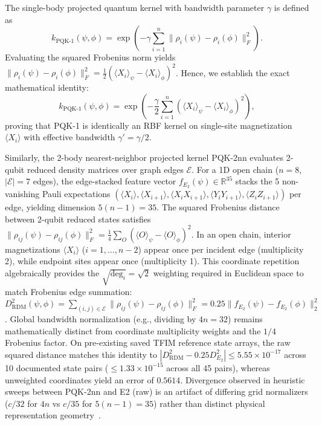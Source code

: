 \documentclass[conference]{IEEEtran}
\begin{document}
The single-body projected quantum kernel with bandwidth parameter $\gamma$ is defined as
\begin{equation}
k_{\text{PQK-1}}(\psi, \phi) = \exp\left( -\gamma \sum_{i=1}^n \|\rho_i(\psi) - \rho_i(\phi)\|_F^2 \right).
\end{equation}
Evaluating the squared Frobenius norm yields $\|\rho_i(\psi) - \rho_i(\phi)\|_F^2 = \frac{1}{2}(\langle X_i \rangle_\psi - \langle X_i \rangle_\phi)^2$. Hence, we establish the exact mathematical identity:
\begin{equation}
k_{\text{PQK-1}}(\psi, \phi) = \exp\left( -\frac{\gamma}{2} \sum_{i=1}^n (\langle X_i \rangle_\psi - \langle X_i \rangle_\phi)^2 \right),
\end{equation}
proving that PQK-1 is identically an RBF kernel on single-site magnetization $\langle X_i \rangle$ with effective bandwidth $\gamma' = \gamma/2$.

Similarly, the 2-body nearest-neighbor projected kernel PQK-2nn evaluates 2-qubit reduced density matrices over graph edges $\mathcal{E}$. For a 1D open chain ($n=8$, $|\mathcal{E}|=7$ edges), the edge-stacked feature vector $f_{E_2}(\psi) \in \mathbb{R}^{35}$ stacks the 5 non-vanishing Pauli expectations $(\langle X_i \rangle, \langle X_{i+1} \rangle, \langle X_i X_{i+1} \rangle, \langle Y_i Y_{i+1} \rangle, \langle Z_i Z_{i+1} \rangle)$ per edge, yielding dimension $5(n-1) = 35$. The squared Frobenius distance between 2-qubit reduced states satisfies $\|\rho_{ij}(\psi) - \rho_{ij}(\phi)\|_F^2 = \frac{1}{4}\sum_{O} (\langle O \rangle_\psi - \langle O \rangle_\phi)^2$. In an open chain, interior magnetizations $\langle X_i \rangle$ ($i=1,\dots,n-2$) appear once per incident edge (multiplicity 2), while endpoint sites appear once (multiplicity 1). This coordinate repetition algebraically provides the $\sqrt{\text{deg}_i} = \sqrt{2}$ weighting required in Euclidean space to match Frobenius edge summation: $D^2_{\mathrm{RDM}}(\psi, \phi) = \sum_{(i,j) \in \mathcal{E}} \|\rho_{ij}(\psi) - \rho_{ij}(\phi)\|_F^2 = 0.25 \|f_{E_2}(\psi) - f_{E_2}(\phi)\|_2^2$. Global bandwidth normalization (e.g., dividing by $4n=32$) remains mathematically distinct from coordinate multiplicity weights and the $1/4$ Frobenius factor. On pre-existing saved TFIM reference state arrays, the raw squared distance matches this identity to $|D^2_{\mathrm{RDM}} - 0.25 D^2_{E_2}| \le 5.55 \times 10^{-17}$ across 10 documented state pairs ($\le 1.33 \times 10^{-15}$ across all 45 pairs), whereas unweighted coordinates yield an error of $0.5614$. Divergence observed in heuristic sweeps between PQK-2nn and E2 (raw) is an artifact of differing grid normalizers ($c/32$ for $4n$ vs $c/35$ for $5(n-1)=35$) rather than distinct physical representation geometry~\cite{Canatar2023bandwidth}.
\end{document}
